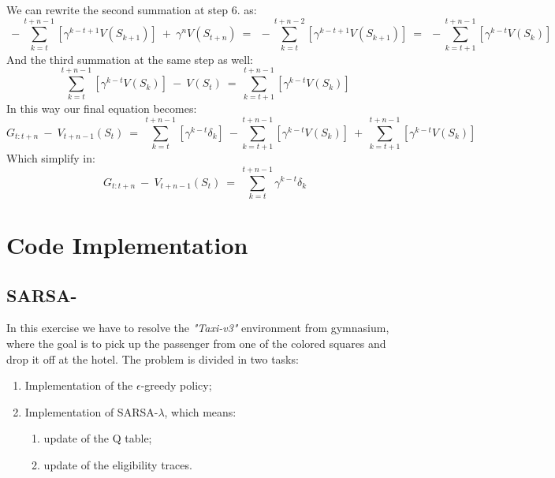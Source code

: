 \documentclass[10pt,a4paper]{article}
\begin{document}
\noindent We can rewrite the second summation at step 6. as: 
\begin{equation*}
    \:-\sum_{k=t}^{t+n-1} [\gamma^{k-t+1} V(S_{k+1})] \:+\: \gamma^{n}V(S_{t+n}) \:=\: \:-\sum_{k=t}^{t+n-2} [\gamma^{k-t+1} V(S_{k+1})] \:=\: \:-\sum_{k=t+1}^{t+n-1} [\gamma^{k-t}V(S_k)]
\end{equation*}
\vspace{5pt}
And the third summation at the same step as well:
\begin{equation*}
    \sum_{k=t}^{t+n-1} [\gamma^{k-t}V(S_k)] \:-\: V(S_t) \:=\: \sum_{k=t+1}^{t+n-1} [\gamma^{k-t}V(S_k)]
\end{equation*}
\vspace{5pt}
In this way our final equation becomes:
\begin{equation*}
    G_{t:t+n} \:-\: V_{t+n-1}(S_t) \:=\: \sum_{k=t}^{t+n-1} [\gamma^{k-t}\delta_k] \:-\sum_{k=t+1}^{t+n-1} [\gamma^{k-t}V(S_k)] \:+\: \sum_{k=t+1}^{t+n-1} [\gamma^{k-t}V(S_k)]
\end{equation*}
\vspace{5pt}
Which simplify in:
\begin{equation*}
    G_{t:t+n} \:-\: V_{t+n-1}(S_t) \:=\: \sum_{k=t}^{t+n-1} \gamma^{k-t}\delta_k
\end{equation*}

\newpage
\section{Code Implementation}

\subsection{SARSA-\textlambda{}}
In this exercise we have to resolve the \textit{"Taxi-v3"} environment from gymnasium, where the goal is to pick up the passenger from one of the colored squares and drop it off at the hotel. The problem is divided in two tasks:
\begin{enumerate}
    \item Implementation of the $\epsilon$-greedy policy;
    \item Implementation of SARSA-$\lambda$, which means:
    \begin{enumerate}
        \item update of the Q table;
        \item update of the eligibility traces.
    \end{enumerate}
\end{enumerate}
\vspace{5pt}
\end{document}
